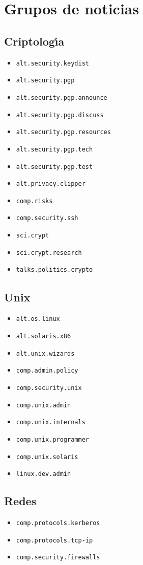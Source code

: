 \section{Grupos de noticias}
\subsection{Criptolog\'{\i}a}
\begin{itemize}
\item {\tt alt.security.keydist}
\item {\tt alt.security.pgp}
\item {\tt alt.security.pgp.announce}
\item {\tt alt.security.pgp.discuss}
\item {\tt alt.security.pgp.resources}
\item {\tt alt.security.pgp.tech}
\item {\tt alt.security.pgp.test}
\item {\tt alt.privacy.clipper}
\item {\tt comp.risks}
\item {\tt comp.security.ssh}
\item {\tt sci.crypt}
\item {\tt sci.crypt.research}
\item {\tt talks.politics.crypto}
\end{itemize}
\subsection{Unix}
\begin{itemize}
\item {\tt alt.os.linux}
\item {\tt alt.solaris.x86}
\item {\tt alt.unix.wizards}
\item {\tt comp.admin.policy}
\item {\tt comp.security.unix}
\item {\tt comp.unix.admin}
\item {\tt comp.unix.internals}
\item {\tt comp.unix.programmer}
\item {\tt comp.unix.solaris}
\item {\tt linux.dev.admin}
\end{itemize}
\subsection{Redes}
\begin{itemize}
\item {\tt comp.protocols.kerberos}
\item {\tt comp.protocols.tcp-ip}
\item {\tt comp.security.firewalls}
\end{itemize}
